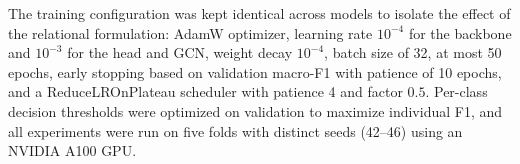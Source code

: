 \documentclass[12pt]{article}
\begin{document}
The training configuration was kept identical across models to isolate the effect of the relational formulation: AdamW optimizer, learning rate $10^{-4}$ for the backbone and $10^{-3}$ for the head and GCN, weight decay $10^{-4}$, batch size of 32, at most 50 epochs, early stopping based on validation macro-F1 with patience of 10 epochs, and a ReduceLROnPlateau scheduler with patience 4 and factor $0.5$. Per-class decision thresholds were optimized on validation to maximize individual F1, and all experiments were run on five folds with distinct seeds (42--46) using an NVIDIA A100 GPU.





\end{document}
